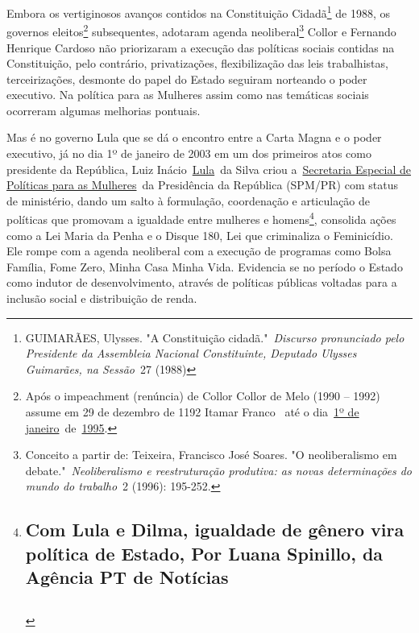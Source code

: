 Embora os vertiginosos avanços contidos na Constituição Cidadã\footnote{GUIMARÃES,
  Ulysses. "A Constituição cidadã."~\emph{Discurso pronunciado pelo
  Presidente da Assembleia Nacional Constituinte, Deputado Ulysses
  Guimarães, na Sessão}~27 (1988)} de 1988, os governos
eleitos\footnote{Após o impeachment (renúncia) de Collor Collor de Melo
  (1990 -- 1992) assume em 29 de dezembro de 1192 Itamar Franco~ até o
  dia~\href{https://pt.wikipedia.org/wiki/1\%C2\%BA_de_janeiro}{1º de
  janeiro}~de~\href{https://pt.wikipedia.org/wiki/1995}{1995}.}
subsequentes, adotaram agenda neoliberal\footnote{Conceito a partir de:
  Teixeira, Francisco José Soares. "O neoliberalismo em
  debate."~\emph{Neoliberalismo e reestruturação produtiva: as novas
  determinações do mundo do trabalho}~2 (1996): 195-252.} Collor e
Fernando Henrique Cardoso não priorizaram a execução das políticas
sociais contidas na Constituição, pelo contrário, privatizações,
flexibilização das leis trabalhistas, terceirizações, desmonte do papel
do Estado seguiram norteando o poder executivo. Na política para as
Mulheres assim como nas temáticas sociais ocorreram algumas melhorias
pontuais.

Mas é no governo Lula que se dá o encontro entre a Carta Magna e o poder
executivo, já no dia 1º de janeiro de 2003 em um dos primeiros atos como
presidente da República, Luiz
Inácio~\href{http://www.pt.org.br/tag/lula/}{Lula}~da Silva criou
a~\href{http://www.spm.gov.br/}{Secretaria Especial de Políticas para as
Mulheres}~da Presidência da República (SPM/PR) com status de ministério,
dando um salto à formulação, coordenação e articulação de políticas que
promovam a igualdade entre mulheres e homens\footnote{\section{\texorpdfstring{
  Com Lula e Dilma, igualdade de gênero vira política de Estado,
  \textbf{Por Luana Spinillo}, da Agência PT de
  Notícias}{ Com Lula e Dilma, igualdade de gênero vira política de Estado, Por Luana Spinillo, da Agência PT de Notícias}}\label{com-lula-e-dilma-igualdade-de-guxeanero-vira-poluxedtica-de-estado-por-luana-spinillo-da-aguxeancia-pt-de-notuxedcias}

  \section{}\label{section}}, consolida ações como a Lei Maria da Penha
e o Disque 180, Lei que criminaliza o Feminicídio. Ele rompe com a
agenda neoliberal com a execução de programas como Bolsa Família, Fome
Zero, Minha Casa Minha Vida. Evidencia se no período o Estado como
indutor de desenvolvimento, através de políticas públicas voltadas para
a inclusão social e distribuição de renda.

